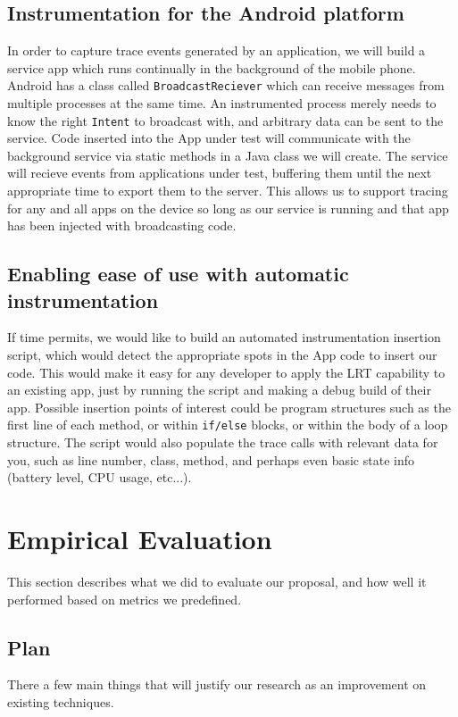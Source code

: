 \documentclass{acm_proc_article-sp}
\begin{document}
\subsection{Instrumentation for the Android platform}
In order to capture trace events generated by an application, we will build
a service app which runs continually in the background of the mobile phone.
Android has a class called \texttt{BroadcastReciever} which can receive messages
from multiple processes at the same time. An instrumented process merely needs
to know the right \texttt{Intent} to broadcast with, and arbitrary data can be
sent to the service. Code inserted into the App under test will communicate with the
background service via static methods in a Java class we will create.
The service will recieve events from applications under test, buffering them until the
next appropriate time to export them to the server. This allows us to support 
tracing for any and all apps on the device so long as our service is running and 
that app has been injected with broadcasting code.

\subsection{Enabling ease of use with automatic instrumentation}
If time permits, we would like to build an automated instrumentation insertion 
script, which would detect the appropriate spots in the App code to insert our 
code. This would make it easy for any developer to apply the LRT capability to
an existing app, just by running the script and making a debug build of their 
app. Possible insertion points of interest could be program structures such as the first
line of each method, or within \texttt{if/else} blocks, or within the body of
a loop structure. The script would also populate the trace calls with relevant data
for you, such as line number, class, method, and perhaps even basic state info (battery
level, CPU usage, etc...).




\section{Empirical Evaluation}
This section describes what we did to evaluate our proposal, and how well it performed
based on metrics we predefined.

\subsection{Plan}
There a few main things that will justify our research as an improvement on existing techniques.
\end{document}
